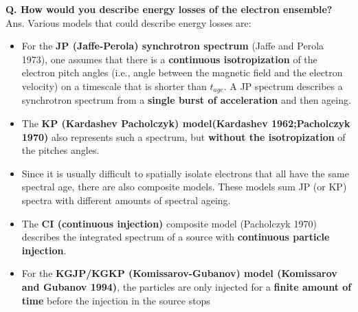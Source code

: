 \documentclass[11pt]{report}
\newcommand{\tbf}[1]{\textbf{#1}}
\begin{document}
 \textbf{Q. How would you describe energy losses of the electron ensemble?}\\
Ans. Various models that could describe energy losses are:
 \begin{itemize}
 \item For the \tbf{JP (Jaffe-Perola) synchrotron spectrum} (Jaffe and Perola 1973), one assumes that there is a \tbf{continuous isotropization} of the electron pitch angles (i.e., angle between the magnetic field and the electron velocity) on a timescale that is shorter than $t_{age}$. A JP spectrum describes a synchrotron spectrum from a \tbf{single burst of acceleration} and then ageing.
 
 \item  The \tbf{KP (Kardashev Pacholczyk) model(Kardashev 1962;Pacholczyk 1970)} also represents such a spectrum, but \tbf{without the isotropization} of the pitches angles. 
 \item  Since it is usually difficult to spatially isolate electrons that all have the same spectral age, there are also composite models. These models sum JP (or KP) spectra with different amounts of spectral ageing.
 
 \item The \tbf{CI (continuous injection)} composite model (Pacholczyk 1970) describes the integrated spectrum of a source with \tbf{continuous particle injection}.
 \item  For the \tbf{KGJP/KGKP (Komissarov-Gubanov) model (Komissarov and Gubanov 1994)}, the particles are only injected for a \tbf{finite amount of time} before the injection in the source stops
 \end{itemize}
\end{document}
